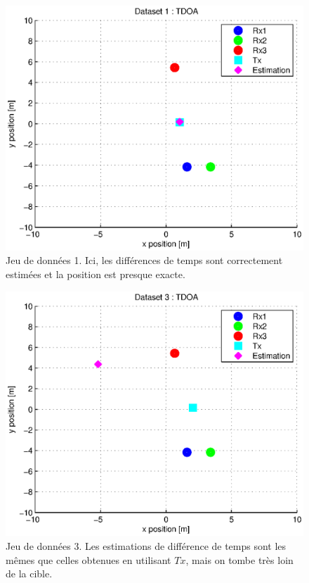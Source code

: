\documentclass[10pt,a4paper]{article}
\begin{document}
\begin{figure}[h]
\centering
\includegraphics[scale = 0.5]{TDOA1}
\caption{Jeu de données 1. Ici, les différences de temps sont correctement estimées et la position est presque exacte.}
\label{ex1}
\end{figure}

\begin{figure}[h]
\centering
\includegraphics[scale = 0.5]{TDOA3}
\caption{Jeu de données 3. Les estimations de différence de temps sont les mêmes que celles obtenues en utilisant $Tx$, mais on tombe très loin de la cible.}
\label{ex2}
\end{figure}
\end{document}
